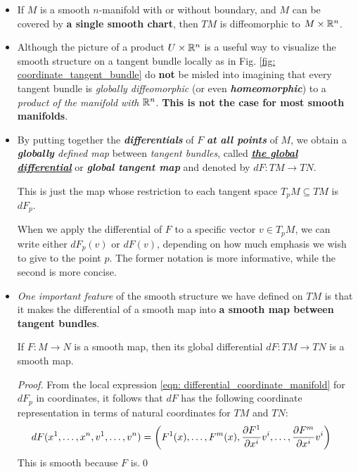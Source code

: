 \documentclass[11pt]{article}
\begin{document}
\begin{itemize}
\item \begin{proposition}
If $M$ is a smooth $n$-manifold with or without boundary, and $M$ can be covered by \textbf{a single smooth chart}, then $TM$ is diffeomorphic to $M \times {\mathbb R}^n$.
\end{proposition}

\item \begin{remark}
Although the picture of a product $U \times {\mathbb R}^n$ is a useful way to visualize the smooth structure on a tangent bundle locally as in Fig. \ref{fig: coordinate_tangent_bundle} do \textbf{not} be misled into imagining that every tangent bundle is \emph{\emph{globally diffeomorphic}} (or even \emph{\textbf{homeomorphic}}) to a \emph{product of the manifold with ${\mathbb R}^n$}. \textbf{This is not the case for most smooth manifolds}.
\end{remark}

\item \begin{definition}
By putting together the \emph{\textbf{differentials}} of $F$ \emph{\textbf{at all points}} of $M$, we obtain a \emph{\textbf{globally} defined map} between \emph{tangent bundles}, called \underline{\emph{\textbf{the global differential}}} or \emph{\textbf{global tangent map}} and denoted by $dF: TM \rightarrow TN$.

This is just the map whose restriction to each tangent space $T_{p}M \subseteq TM$ is $dF_{p}$.
\end{definition}

When we apply the differential of $F$ to a specific vector $v \in T_{p}M$, we can write either $dF_{p}(v)$ or $dF(v)$, depending on how much emphasis we wish to give to the point $p$. The former notation is more informative, while the second is more concise.

\item \emph{One important feature} of the smooth structure we have defined on $TM$ is that it makes the differential of a smooth map into \textbf{a smooth map between tangent bundles}. 
\begin{proposition}
If $F: M \rightarrow N$ is a smooth map, then its global differential $dF: TM \rightarrow TN$ is a smooth map.
\end{proposition}
\begin{proof} %
From the local expression  \eqref{eqn: differential_coordinate_manifold} for $dF_p$ in coordinates, it follows that $dF$ has the following coordinate representation in terms of natural coordinates for $TM$ and $TN$:
\begin{align}
dF(x^{1}, \ldots, x^{n}, v^{1}, \ldots, v^{n}) &= \left(F^{1}(x), \ldots, F^{m}(x),  \frac{\partial F^{1}}{ \partial x^{i}}v^{i}, \ldots, \frac{\partial F^{m}}{ \partial x^{i}}v^{i}\right)  \label{eqn: global_differential_coordinates}
\end{align}
This is smooth because $F$ is.\qed
\end{proof}


\end{itemize}
\end{document}
